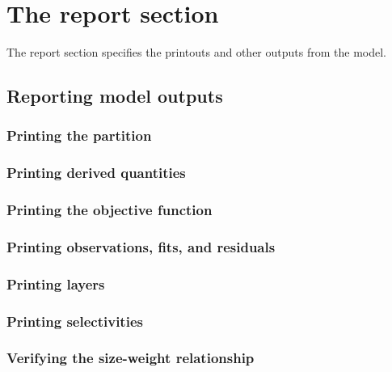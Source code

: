 \section{The report section\label{sec:report-section}}

The report section specifies the printouts and other outputs from the model. 

\subsection{Reporting model outputs}

\subsubsection{Printing the partition}

\subsubsection{Printing derived quantities}

\subsubsection{Printing the objective function}

\subsubsection{Printing observations, fits, and residuals}

\subsubsection{Printing layers}

\subsubsection{Printing selectivities}

\subsubsection{Verifying the size-weight relationship\label{sec:report-weight-at-size}}